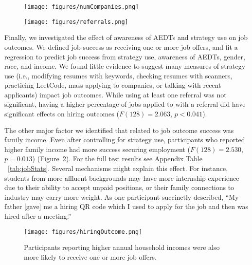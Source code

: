 \begin{figure}
\centering
\begin{minipage}{.45\textwidth}
  \centering
  \texttt{[image: figures/numCompanies.png]}
  \label{fig:numCompanies}
\end{minipage}%
\hspace{0.05\textwidth}
\begin{minipage}{.45\textwidth}
  \centering
  \texttt{[image: figures/referrals.png]}
  \label{fig:referral}
\end{minipage}
\end{figure}

Finally, we investigated the effect of awareness of AEDTs and strategy use on job outcomes. We defined job success as receiving one or more job offers, and fit a regression to predict job success from strategy use, awareness of AEDTs, gender, race, and income.  We found little evidence to suggest many measures of strategy use (i.e., modifying resumes with keywords, checking resumes with scanners, practicing LeetCode, mass-applying to companies, or talking with recent applicants) impact job outcomes. While using at least one referral was not significant, having a higher percentage of jobs applied to with a referral did have significant effects on hiring outcomes ($F(128)=2.063$, $p < 0.041$). 

The other major factor we identified that related to job outcome success was family income. Even after controlling for strategy use, participants who reported higher family income had more success securing employment ($F(128)=2.530$, $p = 0.013$) (Figure~\ref{fig:jobOffers}). For the full test results see Appendix Table ~\ref{tab:jobStats}.
Several mechanisms might explain this effect. For instance, students from more affluent backgrounds may have more internship experience due to their ability to accept unpaid positions, or their family connections to industry may carry more weight. As one participant succinctly described, ``My father [gave] me a hiring QR code which I used to apply for the job and then was hired after a meeting.''

\begin{figure}
    \centering
    \texttt{[image: figures/hiringOutcome.png]}
    \caption{Participants reporting higher annual household incomes were also more likely to receive one or more job offers.}
    \label{fig:jobOffers}
\end{figure}